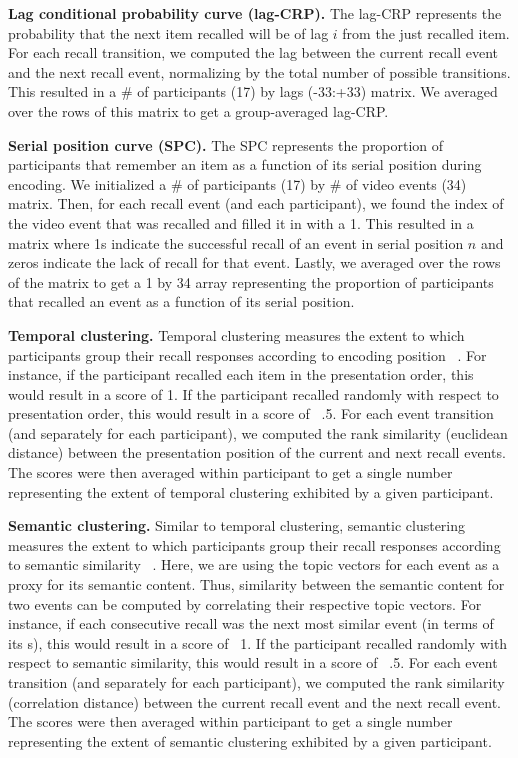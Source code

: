 \documentclass{article}
\begin{document}
\textbf{Lag conditional probability curve (lag-CRP).} The lag-CRP represents the probability that the next item recalled will be of lag $i$ from the just recalled item. For each recall transition, we computed the lag between the current recall event and the next recall event, normalizing by the total number of possible transitions.  This resulted in a \# of participants (17) by lags (-33:+33) matrix. We averaged over the rows of this matrix to get a group-averaged lag-CRP.

\textbf{Serial position curve (SPC).} The SPC represents the proportion of participants that remember an item as a function of its serial position during encoding. We initialized a \# of participants (17) by \# of video events (34) matrix. Then, for each recall event (and each participant), we found the index of the video event that was recalled and filled it in with a 1. This resulted in a matrix where 1s indicate the successful recall of an event in serial position $n$ and zeros indicate the lack of recall for that event.  Lastly, we averaged over the rows of the matrix to get a 1 by 34 array representing the proportion of participants that recalled an event as a function of its serial position.

\textbf{Temporal clustering.} Temporal clustering measures the extent to which participants group their recall responses according to encoding position ~\citep{PolyEtal09}. For instance, if the participant recalled each item in the presentation order, this would result in a score of 1. If the participant recalled randomly with respect to presentation order, this would result in a score of ~.5.  For each event transition (and separately for each participant), we computed the rank similarity (euclidean distance) between the presentation position  of the current and next recall events. The scores were then averaged within participant to get a single number representing the extent of temporal clustering exhibited by a given participant.

\textbf{Semantic clustering.} Similar to temporal clustering, semantic clustering measures the extent to which participants group their recall responses according to semantic similarity ~\citep{PolyEtal09}. Here, we are using the topic vectors for each event as a proxy for its semantic content. Thus, similarity between the semantic content for two events can be computed by correlating their respective topic vectors.  For instance, if each consecutive recall was the next most similar event (in terms of its s), this would result in a score of ~1. If the participant recalled randomly with respect to semantic similarity, this would result in a score of ~.5.  For each event transition (and separately for each participant), we computed the rank similarity (correlation distance) between the current recall event and the next recall event. The scores were then averaged within participant to get a single number representing the extent of semantic clustering exhibited by a given participant.
\end{document}
